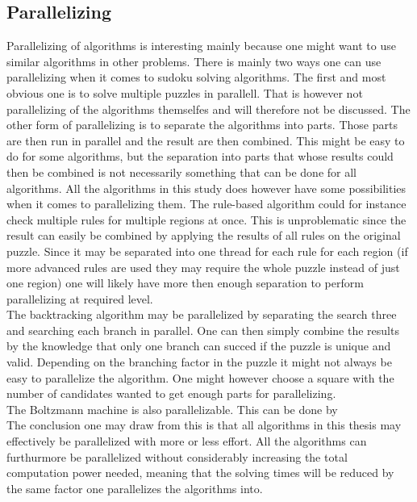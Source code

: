 \documentclass[a4paper,11pt]{kth-mag}
\begin{document}
\subsection{Parallelizing}
Parallelizing of algorithms is interesting mainly because one might want to use similar algorithms in other problems.
There is mainly two ways one can use parallelizing when it comes to sudoku solving algorithms.
The first and most obvious one is to solve multiple puzzles in parallell.
That is however not parallelizing of the algorithms themselfes and will therefore not be discussed.
The other form of parallelizing is to separate the algorithms into parts. Those parts are then run in parallel and the result are then combined.
This might be easy to do for some algorithms, but the separation into parts that whose results could then be combined is not necessarily something that can be done for all algorithms.
All the algorithms in this study does however have some possibilities when it comes to parallelizing them.
The rule-based algorithm could for instance check multiple rules for multiple regions at once.
This is unproblematic since the result can easily be combined by applying the results of all rules on the original puzzle.
Since it may be separated into one thread for each rule for each region (if more advanced rules are used they may require the whole puzzle instead of just one region) one will likely have more then enough separation to perform parallelizing at required level.
\\
The backtracking algorithm may be parallelized by separating the search three and searching each branch in parallel.
One can then simply combine the results by the knowledge that only one branch can succed if the puzzle is unique and valid.
Depending on the branching factor in the puzzle it might not always be easy to parallelize the algorithm.
One might however choose a square with the number of candidates wanted to get enough parts for parallelizing.
\\
The Boltzmann machine is also parallelizable.
This can be done by %
\\
The conclusion one may draw from this is that all algorithms in this thesis may effectively be parallelized with more or less effort.
All the algorithms can furthurmore be parallelized without considerably increasing the total computation power needed, meaning that the solving times will be reduced by the same factor one parallelizes the algorithms into.
\end{document}
